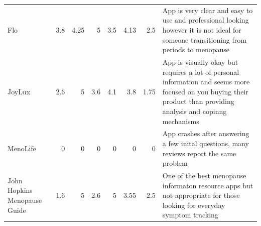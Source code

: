 \begin{table}[]
\begin{tabular}{lrrrr
    >{\columncolor[HTML]{EFEFEF}}r 
    >{\columncolor[HTML]{EFEFEF}}r l}
    Flo                          & 3.8                                     & 4.25                                       & 5                                       & 3.5                                      & 4.13                                                             & 2.5                                                             & App is very clear and easy to use and professional looking however it is not ideal for someone transitioning from periods to menopause                                                                                                                                                                                                                                                     \\
    JoyLux                       & 2.6                                     & 5                                          & 3.6                                     & 4.1                                      & 3.8                                                              & 1.75                                                            & App is visually okay but requires a lot of personal information and seems more focused on you buying their product than providing analysis and copinng mechanisms                                                                                                                                                                                                                          \\
    MenoLife                     & 0                                       & 0                                          & 0                                       & 0                                        & 0                                                                & 0                                                               & App crashes after answering a few inital questions, many reviews report the same problem                                                                                                                                                                                                                                                                                                   \\
    John Hopkins Menopause Guide & 1.6                                     & 5                                          & 2.6                                     & 5                                        & 3.55                                                             & 2.5                                                             & One of the best menopause informaton resource apps but not appropriate for those looking for everyday symptom tracking                                                                                                                                                                                                                                                                     \\ \hline
    \end{tabular}
    \end{table}